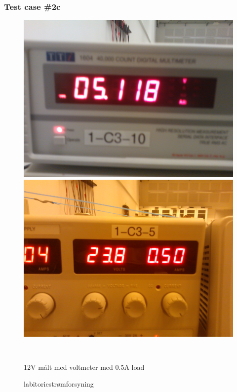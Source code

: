 \subsubsection{Test case \#2c}
\begin{figure}[htbp] \centering
\begin{minipage}[c]{0.48\textwidth} \centering
\includegraphics[width=1.00\textwidth]{billeder/5V_05A_meter.jpg} 
\end{minipage} \hfill
\begin{minipage}[c]{0.48\textwidth} \centering
\includegraphics[width=1.00\textwidth]{billeder/5V_05A_power.jpg} 
\end{minipage} \\ 
\begin{minipage}[b]{0.48\textwidth}
\caption{12V målt med voltmeter med 0.5A load} 
\label{fig:udgang_12V_05A}
\end{minipage} \hfill
\begin{minipage}[b]{0.48\textwidth}
\caption{labitoriestrømforsyning} 
\label{fig:forsyning_12V_05A}
\end{minipage}
\end{figure}
\newpage
